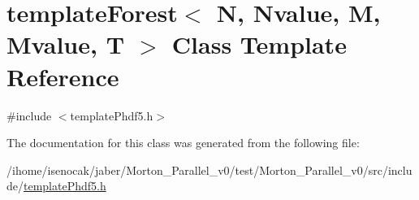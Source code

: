 \hypertarget{classtemplateForest}{}\section{template\+Forest$<$ N, Nvalue, M, Mvalue, T $>$ Class Template Reference}
\label{classtemplateForest}


{\ttfamily \#include $<$template\+Phdf5.\+h$>$}



The documentation for this class was generated from the following file\+:\begin{DoxyCompactItemize}
\item 
/ihome/isenocak/jaber/\+Morton\+\_\+\+Parallel\+\_\+v0/test/\+Morton\+\_\+\+Parallel\+\_\+v0/src/include/\mbox{\hyperlink{templatePhdf5_8h}{template\+Phdf5.\+h}}\end{DoxyCompactItemize}
